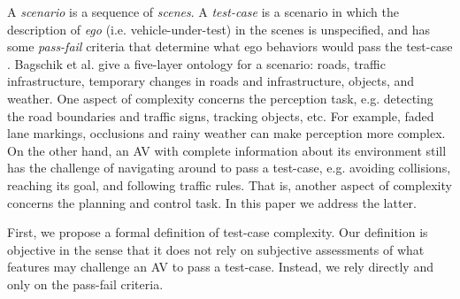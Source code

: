 A \emph{scenario} is a sequence of \emph{scenes}.
%
A \emph{test-case} is a scenario in which the description of \emph{ego} (i.e. vehicle-under-test) in the scenes is unspecified, and has some \emph{pass-fail} criteria that determine what ego behaviors would pass the test-case \cite{Ulbrich.2015}.
%
Bagschik et al. \cite{Bagschik.2018} give a five-layer ontology for a scenario: roads, traffic infrastructure, temporary changes in roads and infrastructure, objects, and weather.
%
One aspect of complexity concerns the perception task, e.g. detecting the road boundaries and traffic signs, tracking objects, etc.
%
For example, faded lane markings, occlusions and rainy weather can make perception more complex.
%
On the other hand, an AV with complete information about its environment still has the challenge of navigating around to pass a test-case, e.g. avoiding collisions, reaching its goal, and following traffic rules.
%
That is, another aspect of complexity concerns the planning and control task.
%
In this paper we address the latter.





First, we propose a formal definition of test-case complexity.
%
Our definition is objective in the sense that it does not rely on subjective assessments of what features may challenge an AV to pass a test-case.
%
Instead, we rely directly and only on the pass-fail criteria.



